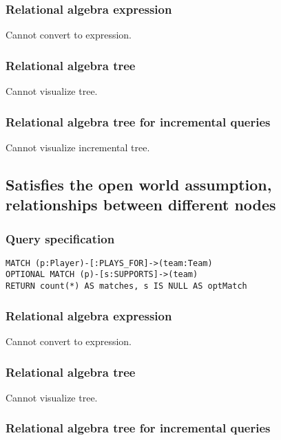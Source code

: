 \subsubsection*{Relational algebra expression}

Cannot convert to expression.

\subsubsection*{Relational algebra tree}

Cannot visualize tree.

\subsubsection*{Relational algebra tree for incremental queries}

Cannot visualize incremental tree.

\subsection{Satisfies the open world assumption, relationships between different nodes}

\subsubsection*{Query specification}

\begin{lstlisting}
MATCH (p:Player)-[:PLAYS_FOR]->(team:Team)
OPTIONAL MATCH (p)-[s:SUPPORTS]->(team)
RETURN count(*) AS matches, s IS NULL AS optMatch
\end{lstlisting}

\subsubsection*{Relational algebra expression}

Cannot convert to expression.

\subsubsection*{Relational algebra tree}

Cannot visualize tree.

\subsubsection*{Relational algebra tree for incremental queries}


